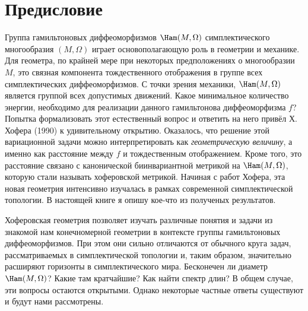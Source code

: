 \chapter*{Предисловие}

Группа гамильтоновых диффеоморфизмов $\Ham(M,\Omega)$ симплектического
многообразия $(M,\Omega)$ играет
основополагающую роль в геометрии и
механике.
Для геометра, по крайней мере при некоторых предположениях
о многообразии $M$, это связная компонента тождественного отображения
в группе всех симплектических диффеоморфизмов.
С точки зрения
механики, $\Ham(M,\Omega)$ является группой всех допустимых движений.
Какое минимальное количество энергии, необходимо для реализации
данного гамильтонова диффеоморфизма $f$?
Попытка формализовать этот естественный вопрос и ответить на него привёл Х. Хофера \cite{H1} (1990) к удивительному открытию.
Оказалось, что решение этой вариационной задачи можно интерпретировать как {}\emph{геометрическую величину}, а именно как расстояние между $f$ и тождественным
отображением.
Кроме того, это расстояние связано с канонической биинвариантной метрикой на $\Ham(M,\Omega)$, которую стали называть хоферовской метрикой.
Начиная с работ Хофера, эта новая геометрия интенсивно изучалась в рамках современной
симплектической топологии.
В настоящей книге я опишу кое-что из полученых результатов.

Хоферовская геометрия позволяет изучать различные понятия и задачи из знакомой нам конечномерной геометрии в контексте группы гамильтоновых диффеоморфизмов.
При этом они сильно отличаются от обычного круга задач, рассматриваемых в симплектической топологии и, таким образом, значительно расширяют горизонты в симплектического мира.
Бесконечен ли диаметр $\Ham(M,\Omega)$?
Какие там кратчайшие?
Как найти спектр длин?
В общем случае, эти вопросы остаются открытыми.
Однако некоторые частные ответы существуют и будут нами рассмотрены.

